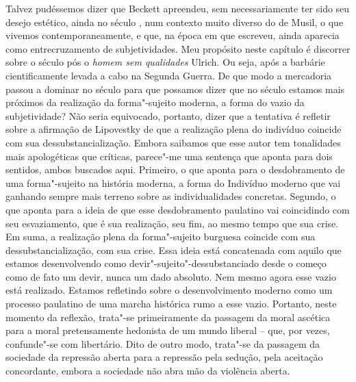 {Talvez pudéssemos dizer que Beckett apreendeu, sem necessariamente ter
sido seu desejo estético, ainda no século , num contexto muito diverso
do de Musil, o que vivemos contemporaneamente, e que, na época em que
escreveu, ainda aparecia como entrecruzamento de subjetividades. Meu
propósito neste capítulo é discorrer sobre o século  pós o \emph{homem
sem qualidades} Ulrich. Ou seja, após a barbárie cientificamente levada a
cabo na Segunda Guerra. De que modo a mercadoria passou a dominar no
século  para que possamos dizer que no século  estamos mais
próximos da realização da forma"-sujeito moderna, a forma do vazio da
subjetividade? Não seria equivocado, portanto, dizer que a tentativa é refletir sobre a
afirmação de Lipovestky de que a realização plena do indivíduo coincide
com sua dessubstancialização. Embora saibamos que esse autor tem
tonalidades mais apologéticas que críticas, parece"-me uma sentença que
aponta para dois sentidos, ambos buscados aqui. Primeiro, o que aponta para o
desdobramento de uma forma"-sujeito na história moderna, a forma do
Indivíduo moderno que vai ganhando sempre mais terreno sobre as
individualidades concretas. Segundo, o que aponta para a ideia de que esse desdobramento
paulatino vai coincidindo com seu esvaziamento, que é sua realização, seu fim, ao
mesmo tempo que sua crise. Em suma, a realização plena da forma"-sujeito
burguesa coincide com sua dessubstancialização, com sua crise. Essa
ideia está concatenada com aquilo que estamos desenvolvendo como
devir"-sujeito"-dessubstanciado desde o começo como de fato um devir,
nunca um dado absoluto. Nem mesmo agora esse vazio está realizado.
Estamos refletindo sobre o desenvolvimento moderno como um processo
paulatino de uma marcha histórica rumo a esse vazio. Portanto, neste momento
da reflexão, trata"-se primeiramente da passagem da moral ascética
para a moral pretensamente hedonista de um mundo liberal -- que, por
vezes, confunde"-se com libertário. Dito de outro modo, trata"-se da
passagem da sociedade da repressão aberta para a repressão pela sedução,
pela aceitação concordante, embora a sociedade não abra mão da violência
aberta.

}
